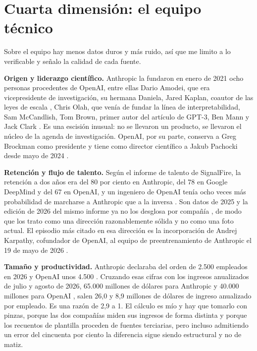 \documentclass[11pt,letterpaper]{article}
\begin{document}
\section{Cuarta dimensión: el equipo técnico}
\label{sec:equipo}

Sobre el equipo hay menos datos duros y más ruido, así que me limito a lo
verificable y señalo la calidad de cada fuente.

\textbf{Origen y liderazgo científico.} Anthropic la fundaron en enero de 2021
ocho personas procedentes de OpenAI, entre ellas Dario Amodei, que era
vicepresidente de investigación, su hermana Daniela, Jared Kaplan, coautor de las
leyes de escala \parencite{kaplan2020}, Chris Olah, que venía de fundar la línea
de interpretabilidad, Sam McCandlish, Tom Brown, primer autor del artículo de
GPT-3, Ben Mann y Jack Clark \parencite{wikipedia2026anthropic}. Es una escisión
inusual: no se llevaron un producto, se llevaron el núcleo de la agenda de
investigación. OpenAI, por su parte, conserva a Greg Brockman como presidente y
tiene como director científico a Jakub Pachocki desde mayo de 2024
\parencite{wikipedia2026openai}.

\textbf{Retención y flujo de talento.} Según el informe de talento de SignalFire,
la retención a dos años era del 80 por ciento en Anthropic, del 78 en Google
DeepMind y del 67 en OpenAI, y un ingeniero de OpenAI tenía ocho veces más
probabilidad de marcharse a Anthropic que a la inversa \parencite{signalfire2025}.
Son datos de 2025 y la edición de 2026 del mismo informe ya no los desglosa por
compañía \parencite{signalfire2026}, de modo que los trato como una dirección
razonablemente sólida y no como una foto actual. El episodio más citado en esa
dirección es la incorporación de Andrej Karpathy, cofundador de OpenAI, al equipo
de preentrenamiento de Anthropic el 19 de mayo de 2026
\parencite{cnbc2026karpathy,techcrunch2026karpathy}.

\textbf{Tamaño y productividad.} Anthropic declaraba del orden de 2.500 empleados
en 2026 y OpenAI unos 4.500 \parencite{wikipedia2026anthropic,wikipedia2026openai}.
Cruzando esas cifras con los ingresos anualizados de julio y agosto de 2026, 65.000
millones de dólares para Anthropic y 40.000 millones para OpenAI
\parencite{techcrunch2026ingresos,bloomberg2026openai}, salen 26,0 y 8,9 millones
de dólares de ingreso anualizado por empleado. Es una razón de 2,9 a 1. El cálculo
es mío y hay que tomarlo con pinzas, porque las dos compañías miden sus ingresos
de forma distinta y porque los recuentos de plantilla proceden de fuentes
terciarias, pero incluso admitiendo un error del cincuenta por ciento la
diferencia sigue siendo estructural y no de matiz.
\end{document}
